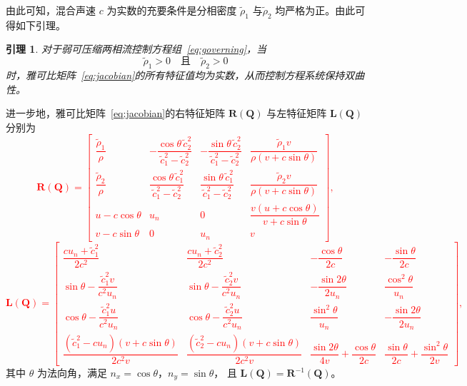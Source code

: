 \documentclass[12pt,a4paper]{article}
\newtheorem{lemma}[theorem]{引理}
\numberwithin{equation}{section}    %
\begin{document}
由此可知，混合声速 $c$ 为实数的充要条件是分相密度 $\tilde{\rho}_1$ 与$\tilde{\rho}_2$ 均严格为正。由此可得如下引理。

\begin{lemma}
    对于弱可压缩两相流控制方程组~\eqref{eq:governing}，当
\begin{equation}
    \tilde{\rho}_1 > 0 \quad \text{且} \quad \tilde{\rho}_2 > 0
\end{equation}
时，雅可比矩阵~\eqref{eq:jacobian}的所有特征值均为实数，从而控制方程系统保持双曲性。
\end{lemma}


进一步地，雅可比矩阵~\eqref{eq:jacobian}的右特征矩阵
$\bm{R}(\bm{Q})$ 与左特征矩阵 $\bm{L}(\bm{Q})$ 分别为\textcolor{red}{
\begin{equation}
    \bm{R}(\bm{Q}) =
    \begin{bmatrix}
        \dfrac{\tilde{\rho}_1}{\rho}
         & -\dfrac{\cos\theta\,\tilde{c}_2^2}{\tilde{c}_1^2 - \tilde{c}_2^2}
         & -\dfrac{\sin\theta\,\tilde{c}_2^2}{\tilde{c}_1^2 - \tilde{c}_2^2}
         & \dfrac{\tilde{\rho}_1 v}{\rho(v + c\sin\theta)} \\[3mm]
        \dfrac{\tilde{\rho}_2}{\rho}
         & \dfrac{\cos\theta\,\tilde{c}_1^2}{\tilde{c}_1^2 - \tilde{c}_2^2}
         & \dfrac{\sin\theta\,\tilde{c}_1^2}{\tilde{c}_1^2 - \tilde{c}_2^2}
         & \dfrac{\tilde{\rho}_2 v}{\rho(v + c\sin\theta)} \\[3mm]
        u - c\cos\theta & u_n & 0
         & \dfrac{v(u + c\cos\theta)}{v + c\sin\theta} \\[3mm]
        v - c\sin\theta & 0 & u_n & v
    \end{bmatrix},
\end{equation}
\begin{equation}
    \bm{L}(\bm{Q}) =
    \begin{bmatrix}
        \dfrac{c u_n + \tilde{c}_1^2}{2c^2}
         & \dfrac{c u_n + \tilde{c}_2^2}{2c^2}
         & -\dfrac{\cos\theta}{2c}
         & -\dfrac{\sin\theta}{2c} \\[3mm]
        \sin\theta - \dfrac{\tilde{c}_1^2 v}{c^2 u_n}
         & \sin\theta - \dfrac{\tilde{c}_2^2 v}{c^2 u_n}
         & -\dfrac{\sin 2\theta}{2 u_n}
         & \dfrac{\cos^2\theta}{u_n} \\[3mm]
        \cos\theta - \dfrac{\tilde{c}_1^2 u}{c^2 u_n}
         & \cos\theta - \dfrac{\tilde{c}_2^2 u}{c^2 u_n}
         & \dfrac{\sin^2\theta}{u_n}
         & -\dfrac{\sin 2\theta}{2 u_n} \\[3mm]
        \dfrac{(\tilde{c}_1^2 - c u_n)(v + c\sin\theta)}{2c^2 v}
         & \dfrac{(\tilde{c}_2^2 - c u_n)(v + c\sin\theta)}{2c^2 v}
         & \dfrac{\sin 2\theta}{4v} + \dfrac{\cos\theta}{2c}
         & \dfrac{\sin\theta}{2c} + \dfrac{\sin^2\theta}{2v}
    \end{bmatrix},
\end{equation}
}
其中 $\theta$ 为法向角，满足 $n_x = \cos\theta$，$n_y = \sin\theta$，
且 $\bm{L}(\bm{Q}) = \bm{R}^{-1}(\bm{Q})$。
\end{document}

